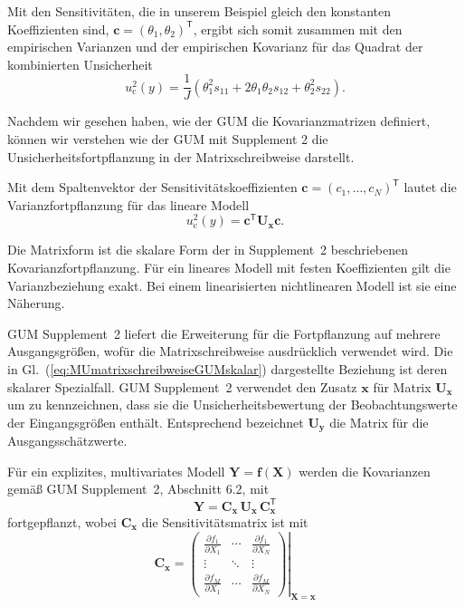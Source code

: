 Mit den Sensitivitäten, die in unserem Beispiel gleich den konstanten Koeffizienten sind, $\mathbf c=(\theta_1,\theta_2)^\mathsf T$, ergibt sich somit zusammen mit den empirischen Varianzen und der empirischen Kovarianz für das Quadrat der kombinierten Unsicherheit
\begin{equation}
u_{\mathrm c}^2(y)
=
\frac{1
}{J} \left(
\theta_1^2s_{1 1}
+2\theta_1\theta_2s_{1 2}
+\theta_2^2s_{2 2}\right).
\end{equation}

Nachdem wir gesehen haben, wie der GUM die Kovarianzmatrizen definiert, können wir verstehen wie der GUM mit Supplement 2 die Unsicherheitsfortpflanzung in der Matrixschreibweise darstellt.

Mit dem Spaltenvektor der Sensitivitätskoeffizienten
$\mathbf c=(c_1,\dots,c_N)^\mathsf T$ lautet die
Varianzfortpflanzung für das lineare Modell
\begin{equation}
\boxed{
u_{\mathrm c}^2(y)
=
\mathbf c^\mathsf T\mathbf U_{\mathbf x}\mathbf c.
}
\label{eq:MUmatrixschreibweiseGUMskalar}
\end{equation}

Die Matrixform ist die skalare Form der in Supplement~2
beschriebenen Kovarianzfortpflanzung. Für ein lineares Modell
mit festen Koeffizienten gilt die Varianzbeziehung exakt.
Bei einem linearisierten nichtlinearen Modell ist sie eine
Näherung.

GUM Supplement~2 liefert die Erweiterung für die Fortpflanzung auf mehrere Ausgangsgrößen, wofür die Matrixschreibweise ausdrücklich verwendet wird. Die in Gl.\ (\ref{eq:MUmatrixschreibweiseGUMskalar}) dargestellte Beziehung ist deren skalarer Spezialfall. GUM Supplement~2 verwendet den Zusatz $\mathbf x$ für Matrix $\mathbf U_{\mathbf x}$ um zu kennzeichnen, dass sie die Unsicherheitsbewertung der Beobachtungswerte der Eingangsgrößen enthält. Entsprechend bezeichnet $\mathbf U_{\mathbf y}$ die Matrix für die Ausgangsschätzwerte.

Für ein explizites, multivariates Modell $\mathbf Y = \mathbf f(\mathbf X)$ werden die Kovarianzen gemäß GUM Supplement~2, Abschnitt 6.2, mit 
\begin{equation}
\mathbf Y = \mathbf C_{\mathbf x} \, \mathbf U_{\mathbf x} \, \mathbf C_{\mathbf x}^\mathsf{T} 
\label{eq:MUfortpflmultiexplizit}
\end{equation}
fortgepflanzt, wobei $\mathbf C_{\mathbf x}$ die Sensitivitätsmatrix ist mit 
\begin{equation}
\mathbf C_{\mathbf x} = \left. \begin{pmatrix}
\frac{\partial f_1}{\partial X_1} & \cdots & \frac{\partial f_1}{\partial X_N}\\
\vdots & \ddots & \vdots\\
\frac{\partial f_M}{\partial X_1} & \cdots & \frac{\partial f_M}{\partial X_N}
\end{pmatrix} \right|_{\mathbf X = \mathbf x}
\label{eq:sensitivitaetsmatrixCxf}
\end{equation}

